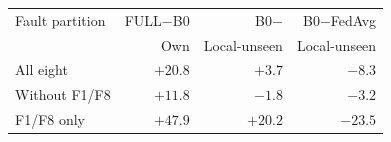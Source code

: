 \begin{tabular}{lrrr}
\toprule
Fault partition & FULL$-$B0 & B0$-$\PROTO{} & B0$-$FedAvg \\
 & Own & Local-unseen & Local-unseen \\
\midrule
All eight & $+20.8$ & $+3.7$ & $-8.3$ \\
Without F1/F8 & $+11.8$ & $-1.8$ & $-3.2$ \\
F1/F8 only & $+47.9$ & $+20.2$ & $-23.5$ \\
\bottomrule
\end{tabular}
